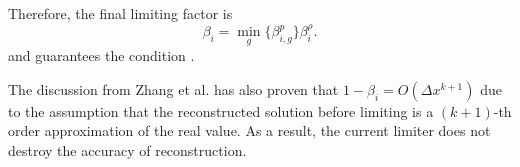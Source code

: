 Therefore, the final limiting factor is
\begin{equation}
    \beta_i = \min_g\{\beta_{i,g}^p\}\beta_i^\rho.
\end{equation}
and guarantees the condition .

The discussion from Zhang et al. \cite{zhang2010positivity} has also proven 
that $1-\beta_{i} = O(\Delta x^{k+1})$ due to the assumption that 
the reconstructed solution before limiting
is a $(k+1)$-th order approximation of the real value. 
As a result, the current limiter does not destroy the accuracy of reconstruction.










